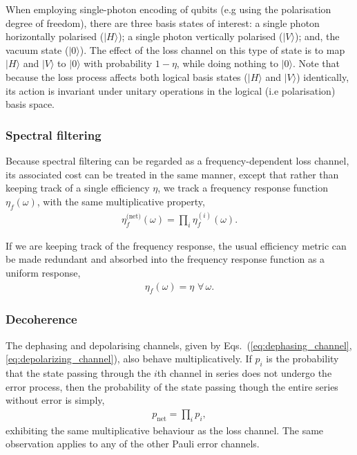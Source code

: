 \documentclass[aps, rmp, twocolumn, amsmath, amssymb, nofootinbib, superscriptaddress, longbibliography, floatfix, table-of-contents, eqsecnum]{revtex4-1}
\newcommand{\ket}[1]{|#1\rangle}
\begin{document}
When employing single-photon encoding of qubits (e.g using the polarisation degree of freedom), there are three basis states of interest: a single photon horizontally polarised ($\ket{H}$); a single photon vertically polarised ($\ket{V}$); and, the vacuum state ($\ket{0}$). The effect of the loss channel on this type of state is to map $\ket{H}$ and $\ket{V}$ to $\ket{\text{0}}$ with probability \mbox{$1-\eta$}, while doing nothing to $\ket{\text{0}}$. Note that because the loss process affects both logical basis states ($\ket{H}$ and $\ket{V}$) identically, its action is invariant under unitary operations in the logical (i.e polarisation) basis space.

%
%

\subsubsection{Spectral filtering} 

Because spectral filtering can be regarded as a frequency-dependent loss channel, its associated cost can be treated in the same manner, except that rather than keeping track of a single efficiency $\eta$, we track a frequency response function $\eta_f(\omega)$, with the same multiplicative property,
\begin{align}
	\eta_f^\text{(net)}(\omega)=\prod_i \eta_f^{(i)}(\omega).
\end{align}

If we are keeping track of the frequency response, the usual efficiency metric can be made redundant and absorbed into the frequency response function as a uniform response,
\begin{align}
	\eta_f(\omega)=\eta\,\,\forall\,\omega.
\end{align}

%
%

\subsubsection{Decoherence}   

The dephasing and depolarising channels, given by Eqs.~(\ref{eq:dephasing_channel},\ref{eq:depolarizing_channel}), also behave multiplicatively. If $p_i$ is the probability that the state passing through the $i$th channel in series does not undergo the error process, then the probability of the state passing though the entire series without error is simply,
\begin{align}
p_\text{net}=\prod_i p_i,
\end{align}
exhibiting the same multiplicative behaviour as the loss channel. The same observation applies to any of the other Pauli error channels.
\end{document}
